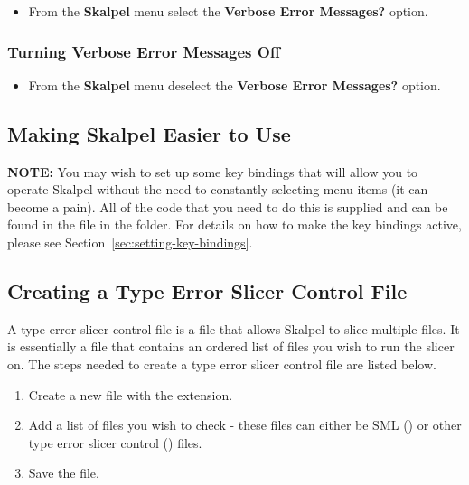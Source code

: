 \documentclass{report}
\begin{document}
  \begin{itemize}
  \item From the \textbf{Skalpel}
    menu select the \textbf{Verbose Error Messages?} option.
  \end{itemize}

\subsubsection{Turning Verbose Error Messages Off}

  \begin{itemize}
  \item From the \textbf{Skalpel} menu
    deselect the \textbf{Verbose Error Messages?} option.
  \end{itemize}


\subsection{Making Skalpel Easier to Use}

\textbf{NOTE:} You may wish to set up some key bindings that will
allow you to operate Skalpel without the need to
constantly selecting menu items (it can become a pain).  All of the
code that you need to do this is supplied and can be found in the
 file in the  folder.
For details on how to make the key bindings active, please see
Section~\ref{sec:setting-key-bindings}.


\subsection{Creating a Type Error Slicer Control File}
\label{sec:skalpel-control-files}

A type error slicer control file is a file that allows Skalpel to
slice multiple files. It is essentially a file that contains an
ordered list of files you wish to run the slicer on. The steps needed
to create a type error slicer control file are listed below.

\begin{enumerate}
\item Create a new file with the  extension.
\item Add a list of files you wish to check - these files can either
  be SML () or other type error slicer control
  () files.

\item Save the file.
\end{enumerate}
\end{document}
